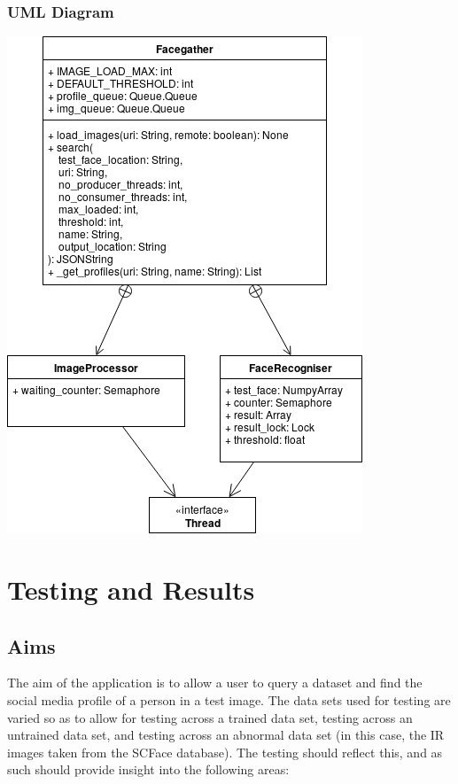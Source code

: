 \documentclass[12pt]{article}
\begin{document}
\subsubsection{UML Diagram}
\includegraphics[scale=1]{res/facegather_uml.png}

\section{Testing and Results}
\subsection{Aims}
The aim of the application is to allow a user to query a dataset and find the social media profile of a person in a test image. The data sets used for testing are varied so as to allow for testing across a trained data set, testing across an untrained data set, and testing across an abnormal data set (in this case, the IR images taken from the SCFace database). The testing should reflect this, and as such should provide insight into the following areas:
\end{document}
